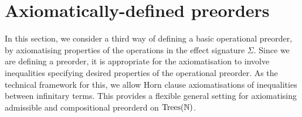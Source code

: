 \section{Axiomatically-defined preorders}

In this section, we consider a third way of defining a basic operational preorder, by axiomatising
properties of the operations in the effect signature $\Sigma$.
Since we are defining a preorder, it is appropriate for the axiomatisation to involve inequalities
specifying desired properties of the operational preorder. As the technical framework for this, we allow
Horn clause axiomatisations of inequalities between infinitary terms.  This provides a flexible general setting for
axiomatising admissible and compositional preorderd on 
$\textnormal{Trees}(\mathbb{N})$. 

